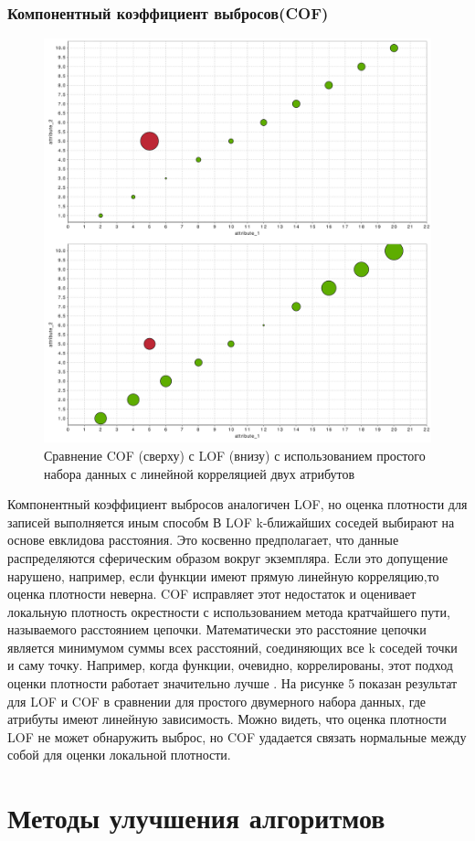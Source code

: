 \subsubsection{Компонентный коэффициент выбросов(COF)}
\begin{figure}[h!]
	\centering
	\includegraphics[width=.5\textwidth]{img/5_3rdpart.png}
	\caption{Сравнение COF (сверху) с LOF (внизу) с использованием простого набора данных с линейной корреляцией двух атрибутов}
	\label{fig05}
\end{figure}
Компонентный коэффициент выбросов аналогичен LOF, но оценка плотности для записей выполняется иным способм В LOF k-ближайших соседей выбирают на основе евклидова расстояния. Это косвенно предполагает, что данные распределяются сферическим образом вокруг экземпляра. Если это допущение нарушено, например, если функции имеют прямую линейную корреляцию,то оценка плотности неверна. COF исправляет этот недостаток и оценивает локальную плотность окрестности с использованием метода кратчайшего пути, называемого расстоянием цепочки. Математически это расстояние цепочки является минимумом суммы всех расстояний, соединяющих все k соседей точки и саму точку. Например, когда функции, очевидно, коррелированы, этот подход оценки плотности работает значительно лучше \cite{Book14}. 
На рисунке 5 показан результат для LOF и COF в сравнении для простого двумерного набора данных, где атрибуты имеют линейную зависимость. Можно видеть, что оценка  плотности LOF не может обнаружить выброс, но COF удадается связать  нормальные между собой для оценки локальной плотности.


\section{Методы улучшения алгоритмов}
